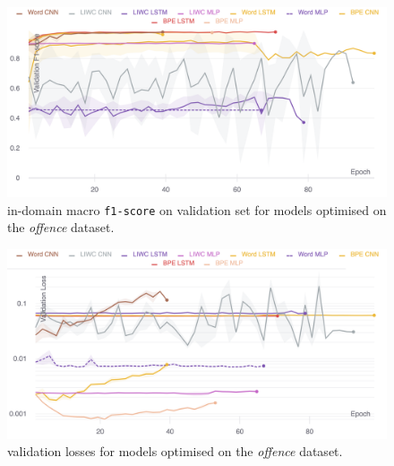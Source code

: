 \begin{figure}
    \centering
    \includegraphics[width=\textwidth]{davidson_dev_f1.pdf}
    \caption{in-domain macro \texttt{f1-score} on validation set for models optimised on the \textit{offence} dataset.}
    \label{fig:davidson_dev_f1}
\end{figure}

\begin{figure}
    \centering
    \includegraphics[width=\textwidth]{davidson_dev_loss_stderr_logscale.pdf}
    \caption{validation losses for models optimised on the \textit{offence} dataset.}
    \label{fig:davidson_dev_loss}
\end{figure}

